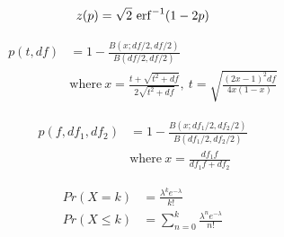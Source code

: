 \begin{align*} 
    z(p) = \sqrt{2}~{\rm erf}^{-1}(1-2p)
\end{align*}

\begin{align*} 
    p(t,df) &= 1-\frac{B(x;df/2,df/2)}{B(df/2,df/2)} \\
    &\text{where}~x =\frac{t+\sqrt{t^2+df}}{2\sqrt{t^2+df}},~t=\sqrt{\frac{(2x-1)^2df}{4x(1-x)}}
\end{align*}

\begin{align*} 
    p(f,df_1,df_2) &= 1-\frac{B(x;df_1/2,df_2/2)}{B(df_1/2,df_2/2)} \\
    &\text{where}~x =\frac{df_1f}{df_1f+df_2}
\end{align*}

\begin{align*} 
    Pr(X=k) &= \frac{\lambda^ke^{-\lambda}}{k!} \\
    Pr(X\leq k) &= \sum_{n=0}^{k}\frac{\lambda^ne^{-\lambda}}{n!}
\end{align*}


